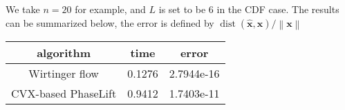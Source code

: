 \documentclass[conference,onecolumn,12pt]{IEEEtran}
\newcommand{\twonorm}[1]{\left\|#1\right\|}
\newcommand{\<}{\langle}
\renewcommand{\>}{\rangle}
\newcommand{\vct}[1]{\bm{#1}}
\numberwithin{equation}{section}
\begin{document}
We take $n=20$ for example, and $L$ is set to be $6$ in the CDF case. The results can be summarized below, the error is defined by $\operatorname{dist}(\hat{\vct{x}},\vct{x})/\twonorm{\vct{x}}$
\begin{table}
  \centering
  \begin{tabular}{ccc}
    \toprule
    algorithm & time & error\\
    \midrule
    Wirtinger flow & 0.1276 & 2.7944e-16\\
CVX-based PhaseLift & 0.9412 &  1.7403e-11\\
    \toprule
  \end{tabular}
\end{table}





\end{document}
